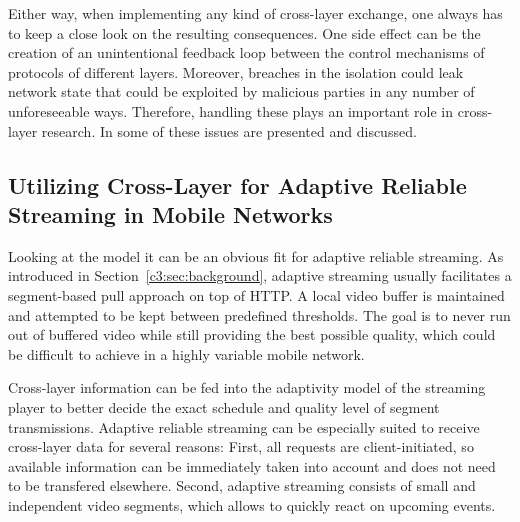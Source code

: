 Either way, when implementing any kind of cross-layer exchange, one always has to keep a close look on the resulting consequences. One side effect can be the creation of an unintentional feedback loop between the control mechanisms of protocols of different layers. Moreover, breaches in the isolation could leak network state that could be exploited by malicious parties in any number of unforeseeable ways. Therefore, handling these plays an important role in cross-layer research. In \cite{1404568} some of these issues are presented and discussed.


\subsection{Utilizing Cross-Layer for Adaptive Reliable Streaming in Mobile Networks}

Looking at the model it can be an obvious fit for adaptive reliable streaming. As introduced in Section~\ref{c3:sec:background}, adaptive streaming usually facilitates a segment-based pull approach on top of \gls{HTTP}. A local video buffer is maintained and attempted to be kept between predefined thresholds. The goal is to never run out of buffered video while still providing the best possible quality, which could be difficult to achieve in a highly variable mobile network.

Cross-layer information can be fed into the adaptivity model of the streaming player to better decide the exact schedule and quality level of segment transmissions. Adaptive reliable streaming can be  especially suited to receive cross-layer data for several reasons: First, all requests are client-initiated, so available information can be immediately taken into account and does not need to be transfered elsewhere. Second, adaptive streaming consists of small and independent video segments, which allows to quickly react on upcoming events.

